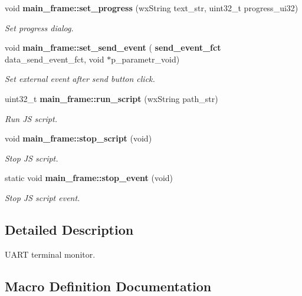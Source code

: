 \begin{DoxyCompactItemize}
void \textbf{ main\+\_\+frame\+::set\+\_\+progress} (wx\+String text\+\_\+str, uint32\+\_\+t progress\+\_\+ui32)
\begin{DoxyCompactList}\small\item\em Set progress dialog. \end{DoxyCompactList}\item 
void \textbf{ main\+\_\+frame\+::set\+\_\+send\+\_\+event} (\textbf{ send\+\_\+event\+\_\+fct} data\+\_\+send\+\_\+event\+\_\+fct, void $\ast$p\+\_\+parametr\+\_\+void)
\begin{DoxyCompactList}\small\item\em Set external event after send button click. \end{DoxyCompactList}\item 
uint32\+\_\+t \textbf{ main\+\_\+frame\+::run\+\_\+script} (wx\+String path\+\_\+str)
\begin{DoxyCompactList}\small\item\em Run JS script. \end{DoxyCompactList}\item 
void \textbf{ main\+\_\+frame\+::stop\+\_\+script} (void)
\begin{DoxyCompactList}\small\item\em Stop JS script. \end{DoxyCompactList}\item 
static void \textbf{ main\+\_\+frame\+::stop\+\_\+event} (void)
\begin{DoxyCompactList}\small\item\em Stop JS script event. \end{DoxyCompactList}\end{DoxyCompactItemize}


\subsection{Detailed Description}
U\+A\+RT terminal monitor. 



\subsection{Macro Definition Documentation}
\mbox{\label{group___u_a_r_t__terminal_ga92e1b0371578874fa2691079da8edc27}} 
